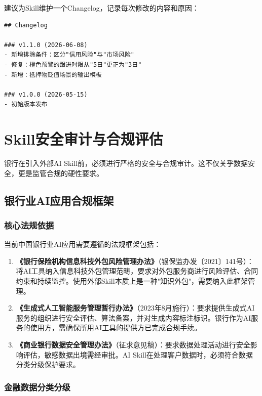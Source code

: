 \begin{notebox}[版本管理建议]
建议为Skill维护一个Changelog，记录每次修改的内容和原因：
\begin{lstlisting}
## Changelog

### v1.1.0 (2026-06-08)
- 新增排除条件：区分"信用风险"与"市场风险"
- 修复：橙色预警的跟进时限从"5日"更正为"3日"
- 新增：抵押物贬值场景的输出模板

### v1.0.0 (2026-05-15)
- 初始版本发布
\end{lstlisting}
\end{notebox}

\section{Skill安全审计与合规评估}

银行在引入外部AI Skill前，必须进行严格的安全与合规审计。这不仅关乎数据安全，更是监管合规的硬性要求。

\subsection{银行业AI应用合规框架}

\subsubsection{核心法规依据}

当前中国银行业AI应用需要遵循的法规框架包括：

\begin{enumerate}[leftmargin=2em]
  \item \textbf{《银行保险机构信息科技外包风险管理办法》}（银保监办发〔2021〕141号）：将AI工具纳入信息科技外包管理范畴，要求对外包服务商进行风险评估、合同约束和持续监控。使用外部Skill本质上是一种"知识外包"，需要纳入此框架管理。
  \item \textbf{《生成式人工智能服务管理暂行办法》}（2023年8月施行）：要求提供生成式AI服务的组织进行安全评估、算法备案，并对生成内容标注标识。银行作为AI服务的使用方，需确保所用AI工具的提供方已完成合规手续。
  \item \textbf{《商业银行数据安全管理办法》}（征求意见稿）：要求数据处理活动进行安全影响评估，敏感数据出境需经审批。AI Skill在处理客户数据时，必须符合数据分类分级保护要求。
\end{enumerate}

\subsubsection{金融数据分类分级}

